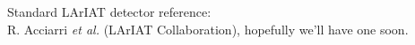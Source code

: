 \documentclass[aps,prl,twocolumn,showpacs,superscriptaddress,groupedaddress]{revtex4}  %
\begin{document}









\begin{thebibliography}{99}

    Standard LArIAT detector reference:  \\
R. Acciarri {\sl et al.} (LArIAT Collaboration),
hopefully we'll have one soon.

 \end{thebibliography}
\end{document}
